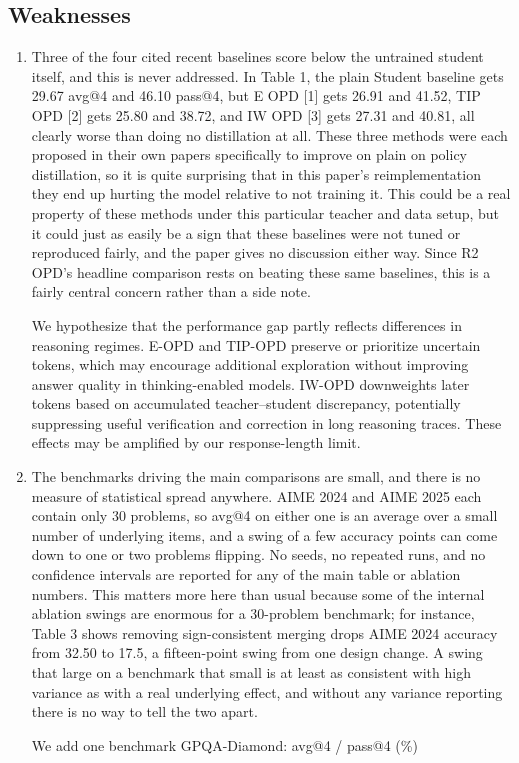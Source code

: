 \subsection*{Weaknesses}
\begin{enumerate}
\item[W1] Three of the four cited recent baselines score below the untrained student itself, and this is never addressed. In Table 1, the plain Student baseline gets 29.67 avg@4 and 46.10 pass@4, but E OPD [1] gets 26.91 and 41.52, TIP OPD [2] gets 25.80 and 38.72, and IW OPD [3] gets 27.31 and 40.81, all clearly worse than doing no distillation at all. These three methods were each proposed in their own papers specifically to improve on plain on policy distillation, so it is quite surprising that in this paper's reimplementation they end up hurting the model relative to not training it. This could be a real property of these methods under this particular teacher and data setup, but it could just as easily be a sign that these baselines were not tuned or reproduced fairly, and the paper gives no discussion either way. Since R2 OPD's headline comparison rests on beating these same baselines, this is a fairly central concern rather than a side note.
\par{}
\begin{responsebox}[frametitle={Response to W1}]
We hypothesize that the performance gap partly reflects differences in reasoning regimes. E-OPD and TIP-OPD preserve or prioritize uncertain tokens, which may encourage additional exploration without improving answer quality in thinking-enabled models. IW-OPD downweights later tokens based on accumulated teacher--student discrepancy, potentially suppressing useful verification and correction in long reasoning traces. These effects may be amplified by our response-length limit.
\end{responsebox}

\item[W2] The benchmarks driving the main comparisons are small, and there is no measure of statistical spread anywhere. AIME 2024 and AIME 2025 each contain only 30 problems, so avg@4 on either one is an average over a small number of underlying items, and a swing of a few accuracy points can come down to one or two problems flipping. No seeds, no repeated runs, and no confidence intervals are reported for any of the main table or ablation numbers. This matters more here than usual because some of the internal ablation swings are enormous for a 30-problem benchmark; for instance, Table 3 shows removing sign-consistent merging drops AIME 2024 accuracy from 32.50 to 17.5, a fifteen-point swing from one design change. A swing that large on a benchmark that small is at least as consistent with high variance as with a real underlying effect, and without any variance reporting there is no way to tell the two apart.
\par{}
\begin{responsebox}[frametitle={Response to W2}]
We add one benchmark GPQA-Diamond: avg@4 / pass@4 (\%)


\end{responsebox}
\end{enumerate}
